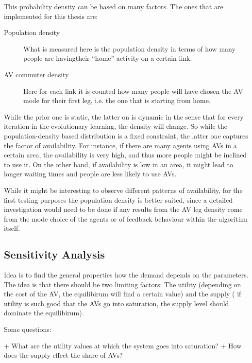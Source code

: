 This probability density can be based on many factors. The ones that are implemented
for this thesis are:

\begin{description}
\item[Population density] What is measured here is the population density in terms of
how many people are havingtheir ``home'' activity on a certain link.
\item[AV commuter density] Here for each link it is counted how many people will
have chosen the AV mode for their first leg, i.e. the one that is starting from home.
\end{description}

While the prior one is static, the latter on is dynamic in the sense that for every
iteration in the evolutionary learning, the density will change. So while the
population-density based distribution is a fixed constraint, the latter one captures
the factor of availability. For instance, if there are many agents using AVs in a
certain area, the availability is very high, and thus more people might be inclined
to use it. On the other hand, if availability is low in an area, it might lead to
longer waiting times and people are less likely to use AVs.

While it might be interesting to observe different patterns of availability,
for the first testing purposes the population density is better suited, since a
detailed investigation would need to be done if any results from the AV leg density
come from the mode choice of the agents or of feedback behaviour within the algorithm
itself.

\subsection{Sensitivity Analysis}


Idea is to find the general properties how the demand depends on the
parameters. The idea is that there should be two limiting factors: The utility (depending
on the cost of the AV, the equilibirum will find a certain value) and the supply (
if utility is such good that the AVs go into saturation, the supply level should
dominate the equilibirum).

Some questions:

+ What are the utility values at which the system goes into saturation?
+ How does the supply effect the share of AVs?

